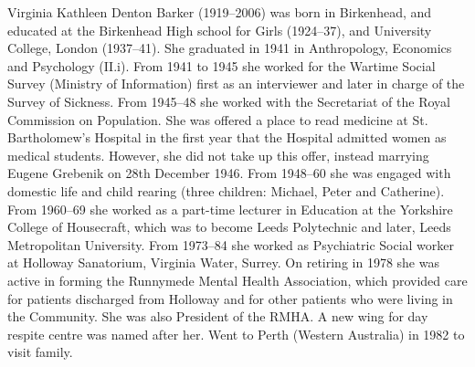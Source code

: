 
Virginia Kathleen Denton Barker (1919--2006) was born in Birkenhead, and educated at the Birkenhead High school for Girls (1924--37), and University College, London (1937--41). She graduated in 1941 in Anthropology, Economics and Psychology (II.i). From 1941 to 1945 she worked for the Wartime Social Survey (Ministry of Information) first as an interviewer and later in charge of the Survey of Sickness. From 1945--48 she worked with the Secretariat of the Royal Commission on Population. She was offered a place to read medicine at St. Bartholomew's Hospital in the first year that the Hospital admitted women as medical students. However, she did not take up this offer, instead marrying Eugene Grebenik on 28th December 1946. From 1948--60 she was engaged with domestic life and child rearing (three children: Michael, Peter and Catherine). From 1960--69 she worked as a part-time lecturer in Education at the Yorkshire College of Housecraft, which was to become Leeds Polytechnic and later, Leeds Metropolitan University. From 1973--84 she worked as Psychiatric Social worker at Holloway Sanatorium, Virginia Water, Surrey. On retiring in 1978 she was active in forming the Runnymede Mental Health Association, which provided care for patients discharged from Holloway and for other patients who were living in the Community. She was also President of the RMHA. A new wing for day respite centre was named after her. \cite{VirginiaDocs} Went to Perth (Western Australia) in 1982 to visit family.
